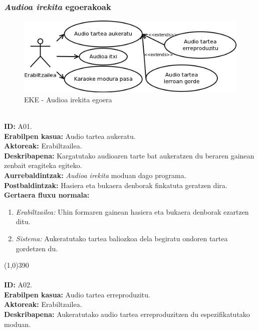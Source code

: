 \subsubsection{\textit{Audioa irekita} egoerakoak}
\begin{figure}[htp]
\begin{center}
\includegraphics[scale=0.6]{Pictures/Chapter4/Analisia/EKE-Audioa.png}
\caption{EKE - Audioa irekita egoera}
\label{eke-audioa}
\end{center}
\end{figure}
\noindent\\
\textbf{ID:} A01.\\
\textbf{Erabilpen kasua:} Audio tartea aukeratu.\\
\textbf{Aktoreak:} Erabiltzailea.\\
\textbf{Deskribapena:} Kargatutako audioaren tarte bat aukeratzen du beraren gainean zenbait eragiteka egiteko.\\
\textbf{Aurrebaldintzak:} \textit{Audioa irekita} moduan dago programa.\\
\textbf{Postbaldintzak:} Hasiera eta bukaera denborak finkatuta geratzen dira.\\
\textbf{Gertaera fluxu normala:}
\begin{enumerate}
	\item \textit{Erabiltzailea:} Uhin formaren gainean hasiera eta bukaera denborak ezartzen ditu.
	\item \textit{Sistema:} Aukeratutako tartea baliozkoa dela begiratu ondoren tartea gordetzen du.
\end{enumerate}
\line(1,0){390}\\
\noindent\\
\textbf{ID:} A02.\\
\textbf{Erabilpen kasua:} Audio tartea erreproduzitu.\\
\textbf{Aktoreak:} Erabiltzailea.\\
\textbf{Deskribapena:} Aukeratutako audio tartea erreproduzitzen du espezifikatutako moduan.\\
